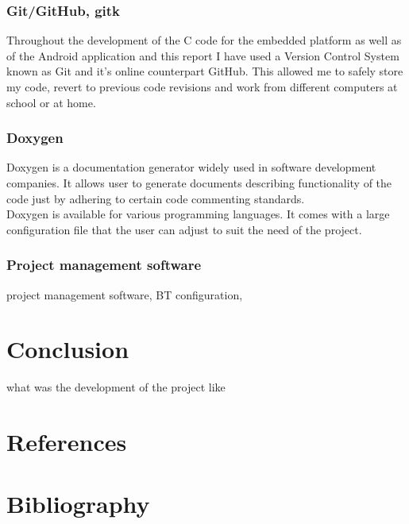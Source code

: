 \documentclass[12pt,a4paper]{article}
\begin{document}
		\subsubsection{Git/GitHub, gitk}
		Throughout the development of the C code for the embedded platform as well as of the 
		Android application and this report I have used a Version Control System known as Git and 
		it's online counterpart GitHub. This allowed me to safely store my code, revert to 
		previous code revisions and work from different computers at school or at home.
		
		\subsubsection{Doxygen}
		Doxygen is a documentation generator widely used in software development companies. It
		allows user to generate documents describing functionality of the code just by adhering 
		to certain code commenting standards.\\
		
		Doxygen is available for various programming languages. It comes with a large configuration 
		file that the user can adjust to suit the need of the project.
		
		\subsubsection{Project management software}
		project management software, BT configuration,
		\newpage
	
	\section{Conclusion}
	what was the development of the project like
	\newpage
	
	\section{References}
	\newpage
	
	\section{Bibliography}
	\newpage
	
	\listoffigures
	
\end{document}
